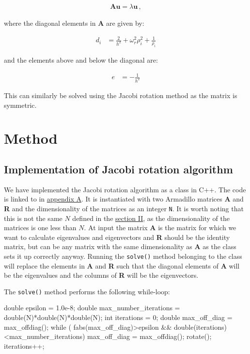 \documentclass[reprint,english,notitlepage]{revtex4-1}  %
\begin{document}
\begin{align*}
\textbf{Au} = \lambda \textbf{u} \, ,
\end{align*}

where the diagonal elements in \textbf{A} are given by:

\begin{align*}
d_i &= \frac{2}{h^2} + \omega_r^2 \rho_i^2 + \frac{1}{\rho_i}
\end{align*}

and the elements above and below the diagonal are:

\begin{align*}
e &= - \frac{1}{h^2}
\end{align*}

This can similarly be solved using the Jacobi rotation method as the matrix is symmetric.

\newpage


\section{Method} \label{sec:III}

\subsection{Implementation of Jacobi rotation algorithm} \label{sec:III:a}

We have implemented the Jacobi rotation algorithm as a class in C++. The code is linked to in \hyperref[A]{appendix A}. It is instantiated with two Armadillo \citep{Armadillo} matrices \textbf{A} and \textbf{R} and the dimensionality of the matrices as an integer \verb+N+. It is worth noting that this is not the same $N$ defined in the \hyperref[sec:II]{section II}, as the dimensionality of the matrices is one less than $N$. At input the matrix \textbf{A} is the matrix for which we want to calculate eigenvalues and eigenvectors and \textbf{R} should be the identity matrix, but can be any matrix with the same dimensionality as \textbf{A} as the class sets it up correctly anyway. Running the \verb+solve()+ method belonging to the class will replace the elements in \textbf{A} and \textbf{R} such that the diagonal elements of \textbf{A} will be the eigenvalues and the columns of \textbf{R} will be the eigenvectors. 

The \verb+solve()+ method performs the following while-loop:

\begin{cpp}
double epsilon = 1.0e-8; 
double max_number_iterations = double(N)*double(N)*double(N);
int iterations = 0;
double max_off_diag = max_offdiag();
while ( fabs(max_off_diag)>epsilon &&
        double(iterations)<max_number_iterations){
    max_off_diag = max_offdiag();
    rotate();
    iterations++;
}
\end{cpp}
\end{document}

